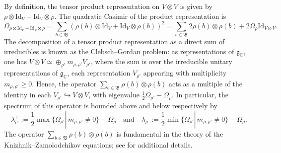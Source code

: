 \documentclass[12pt,a4paper]{amsart}
\numberwithin{equation}{section}
\theoremstyle{remark}
\theoremstyle{definition}
\newcommand{\kg}{\mathfrak g}
\newcommand{\C}{\mathbb C}
\newcommand{\kB}{\mathfrak B}
\newcommand{\qand}{\quad\text{and}\quad}
\begin{document}
By definition, the tensor product representation on $V\otimes V$ is given by $\rho\otimes\mathrm{Id}_V+\mathrm{Id}_V\otimes\rho$. The quadratic Casimir of the product representation is
\[\Omega_{\rho\otimes\mathrm{Id}_V+\mathrm{Id}_V\otimes\rho}=\sum_{b\in\kB}(\rho(b)\otimes\mathrm{Id}_V+\mathrm{Id}_V\otimes\rho(b))^2=\sum_{b\in\kB}2\rho(b)\otimes\rho(b)+2\Omega_\rho\mathrm{Id}_{V\otimes V}.\]
The decomposition of a tensor product representation as a direct sum of irreducibles is known as the Clebsch--Gordan problem: as representations of $\kg_\C$, one has $V\otimes V\simeq\oplus_{\rho'}m_{\rho,\rho'}V_{\rho'}$, where the sum is over the irreducible unitary representations of $\kg_\C$, each representation $V_{\rho'}$ appearing with multiplicity $m_{\rho,\rho'}\geq0$. Hence, the operator $\sum_{b\in\kB}\rho(b)\otimes\rho(b)$ acts as a multiple of the identity in each $V_{\rho'}\hookrightarrow V\otimes V$, with eigenvalue $\frac{1}{2}\Omega_{\rho'}-\Omega_\rho$. In particular, the spectrum of this operator is bounded above and below respectively by
  \begin{equation}\label{eq:lambda_rho}
  \lambda_\rho^+:=\frac{1}{2}\max\{\Omega_{\rho'}|\,m_{\rho,\rho'}\neq0\}-\Omega_\rho\qand\lambda_\rho^-:=\frac{1}{2}\min\{\Omega_{\rho'}|\,m_{\rho,\rho'}\neq0\}-\Omega_\rho.
  \end{equation}
  The operator $\sum_{b\in\kB}\rho(b)\otimes\rho(b)$ is fundamental in the theory of the Knizhnik--Zamolodchikov equations; see \cite[Lecture~2.5]{EFK_KZ-lectures} for additional details.
 
\end{document}

